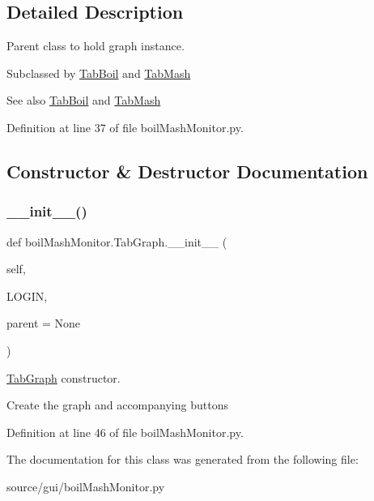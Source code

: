 \subsection{Detailed Description}
Parent class to hold graph instance. 

Subclassed by \mbox{\hyperlink{classboil_mash_monitor_1_1_tab_boil}{Tab\+Boil}} and \mbox{\hyperlink{classboil_mash_monitor_1_1_tab_mash}{Tab\+Mash}} \begin{DoxySeeAlso}{See also}
\mbox{\hyperlink{classboil_mash_monitor_1_1_tab_boil}{Tab\+Boil}} and \mbox{\hyperlink{classboil_mash_monitor_1_1_tab_mash}{Tab\+Mash}} 
\end{DoxySeeAlso}


Definition at line 37 of file boil\+Mash\+Monitor.\+py.



\subsection{Constructor \& Destructor Documentation}
\mbox{\label{classboil_mash_monitor_1_1_tab_graph_a59c4db388a7c573bac6d61f867fa80de}} 
\subsubsection{\texorpdfstring{\_\_init\_\_()}{\_\_init\_\_()}}
{\footnotesize\ttfamily def boil\+Mash\+Monitor.\+Tab\+Graph.\+\_\+\+\_\+init\+\_\+\+\_\+ (\begin{DoxyParamCaption}\item[{}]{self,  }\item[{}]{L\+O\+G\+IN,  }\item[{}]{parent = {\ttfamily None} }\end{DoxyParamCaption})}



\mbox{\hyperlink{classboil_mash_monitor_1_1_tab_graph}{Tab\+Graph}} constructor. 

Create the graph and accompanying buttons 

Definition at line 46 of file boil\+Mash\+Monitor.\+py.



The documentation for this class was generated from the following file\+:\begin{DoxyCompactItemize}
\item 
source/gui/boil\+Mash\+Monitor.\+py\end{DoxyCompactItemize}
